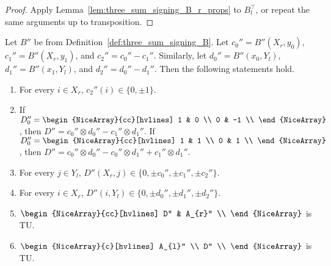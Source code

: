 \begin{proof}
    Apply Lemma~\ref{lem:three_sum_signing_B_r_props} to $B_{l}^{\top}$, or repeat the same arguments up to transposition.
\end{proof}

\begin{lemma}\label{lem:three_sum_signing_B_props}
    Let $B''$ be from Definition~\ref{def:three_sum_signing_B}. Let $c_{0}'' = B'' (X_{r}, y_{0})$, $c_{1}'' = B'' (X_{r}, y_{1})$, and $c_{2}'' = c_{0}'' - c_{1}''$. Similarly, let $d_{0}'' = B'' (x_{0}, Y_{l})$, $d_{1}'' = B'' (x_{1}, Y_{l})$, and $d_{2}'' = d_{0}'' - d_{1}''$. Then the following statements hold.
    \begin{enumerate}
        \item\label{item:tss_Bp_c2} For every $i \in X_{r}$, $c_{2}'' (i) \in \{0, \pm 1\}$.
        \item\label{item:tss_Bp_Deq} If $D_{0}'' = \begin{NiceArray}{cc}[hvlines] 1 & 0 \\ 0 & -1 \\ \end{NiceArray}$, then $D'' = c_{0}'' \otimes d_{0}'' - c_{1}'' \otimes d_{1}''$. If $D_{0}'' = \begin{NiceArray}{cc}[hvlines] 1 & 1 \\ 0 & 1 \\ \end{NiceArray}$, then $D'' = c_{0}'' \otimes d_{0}'' - c_{0}'' \otimes d_{1}'' + c_{1}'' \otimes d_{1}''$.
        \item\label{item:tss_Bp_Dcols} For every $j \in Y_{l}$, $D'' (X_{r}, j) \in \{0, \pm c_{0}'', \pm c_{1}'', \pm c_{2}''\}$.
        \item\label{item:tss_Bp_Drows} For every $i \in X_{r}$, $D'' (i, Y_{l}) \in \{0, \pm d_{0}'', \pm d_{1}'', \pm d_{2}''\}$.
        \item\label{item:tss_Bp_DAr} $\begin{NiceArray}{cc}[hvlines] D'' & A_{r}'' \\ \end{NiceArray}$ is TU.
        \item\label{item:tss_Bp_AlD} $\begin{NiceArray}{c}[hvlines] A_{l}'' \\ D'' \\ \end{NiceArray}$ is TU.
    \end{enumerate}
\end{lemma}

